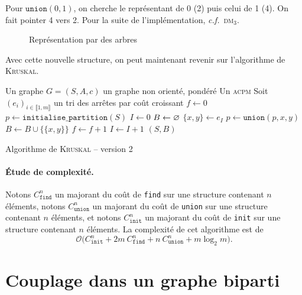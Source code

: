 \begin{rmk}
	Pour $\texttt{union}(0, 1)$, on cherche le représentant de 0 (2) puis celui de 1 (4). On fait pointer 4 vers 2.
	Pour la suite de l'implémentation, \textit{c.f.}\ \textsc{dm}$_3$.

	\begin{figure}[H]
		\centering
		\caption{Représentation par des arbres}
	\end{figure}
\end{rmk}

Avec cette nouvelle structure, on peut maintenant revenir sur l'algorithme de \textsc{Kruskal}.

\begin{algorithm}[H]
	\centering
	\begin{algorithmic}[1]
		\Entree Un graphe $G = (S, A, c)$\/ un graphe non orienté, pondéré
		\Sortie Un \textsc{acpm}
		\State Soit $(e_i)_{i\in\llbracket 1,m \rrbracket}$\/ un tri des arrêtes par coût croissant
		\State $f \gets 0$\/ 
		\State $p \gets \texttt{initialise\_partition}(S)$\/ 
		\State $I \gets 0$\/ 
		\State $B \gets \varnothing$\/ 
			\State $\{x,y\} \gets e_I$\/ 
				\State $p \gets \texttt{union}(p, x, y)$\/ 
				\State $B \gets B \cup \{\!\{x,y\}\!\}$\/ 
				\State $f \gets f + 1$\/ 
			\EndIf
			\State $I \gets I + 1$\/
		\EndWhile
		\State\Return $(S,B)$
	\end{algorithmic}
	\caption{Algorithme de \textsc{Kruskal} -- version 2}
\end{algorithm}

\paragraph{Étude de complexité.}
Notons $C_{\texttt{find}}^n$\/ un majorant du coût de \texttt{find} sur une structure contenant $n$\/ éléments, notons $C_{\texttt{union}}^n$\/ un majorant du coût de \texttt{union} sur une structure contenant $n$\/ éléments, et notons $C_{\texttt{init}}^n$\/ un majorant du coût de \texttt{init} sur une structure contenant $n$\/ éléments.
La complexité de cet algorithme est de \[
	\mathcal{O}\big(C_{\texttt{init}}^n + 2m\:C_{\texttt{find}}^n + n\: C_{\texttt{union}}^n + m \log_2 m\big)
.\]

\section{Couplage dans un graphe biparti}

